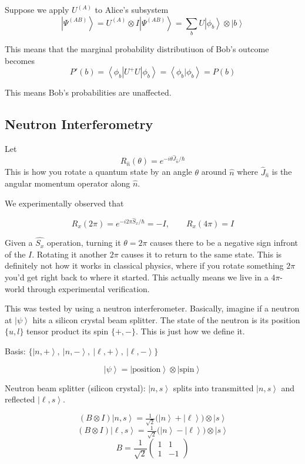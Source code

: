 \documentclass[
]{article}
\providecommand{\ket}[1]{\left\lvert #1 \right\rangle}
\providecommand{\bra}[1]{\left\langle #1 \right\rvert}
\providecommand{\braket}[1]{\left\langle #1 \right\rangle}
\begin{document}
Suppose we apply $U^{(A)}$  to Alice's subsystem
\[
	\ket{\Psi^{(AB)}} = U^{(A)} \otimes I \ket{\Psi^{(AB)}}=\sum_b U\ket{\phi_b} \otimes \ket{b}
\]

This means that the marginal probability distributiuon of Bob's outcome becomes
\[
	P'(b)=\bra{\phi_b}U^+U \ket{\phi_b}=\braket{\phi_b|\phi_b}=P(b)
\]

This means Bob's probabilities are unaffected.

\subsection{Neutron Interferometry}\label{neutron-interferometry}

Let
\[
	R_{\hat{n}}(\theta) = e^{-i \theta \hat{J}_{\hat{n}} / \hbar}
\]
This is how you rotate a quantum state by an angle $\theta$ around $\hat{n}$ where $\hat{J}_{\hat{n}}$ is the angular momentum operator along $\hat{n}$.

We experimentally observed that

\[
	R_x(2\pi) = e^{-i 2\pi \hat{S}_x / \hbar} = -I, \qquad R_x(4\pi) = I
\]

Given a $\hat{S_x}$ operation, turning it $\theta=2\pi$ causes there to be a negative sign infront of the $I$. Rotating it another $2\pi$ causes it to return to the same state. This is definitely not how it works in classical physics, where if you rotate something $2\pi$ you'd get right back to where it started.
This actually means we live in a $4\pi$-world through experimental verification.

This was tested by using a neutron interferometer. Basically, imagine if a neutron at $\ket{\psi}$ hits a silicon crystal beam splitter. The state of the neutron is its position $\{u,l\} $ tensor product its spin $\{+, -\}$.
This is just how we define it.

Basis: $\{\ket{n,+},\ \ket{n,-},\ \ket{\ell,+},\ \ket{\ell,-}\}$

\[
	\ket{\psi} = \ket{\text{position}} \otimes \ket{\text{spin}}
\]

Neutron beam splitter (silicon crystal): $\ket{n,s}$ splits into transmitted $\ket{n,s}$ and reflected $\ket{\ell,s}$.

\[
	(B \otimes I)\ket{n,s} = \tfrac{1}{\sqrt{2}}\bigl(\ket{n} + \ket{\ell}\bigr) \otimes \ket{s}
\]
\[
	(B \otimes I)\ket{\ell,s} = \tfrac{1}{\sqrt{2}}\bigl(\ket{n} - \ket{\ell}\bigr) \otimes \ket{s}
\]
\[
	B = \frac{1}{\sqrt{2}} \begin{pmatrix} 1 & 1 \\ 1 & -1 \end{pmatrix}
\]
\end{document}
